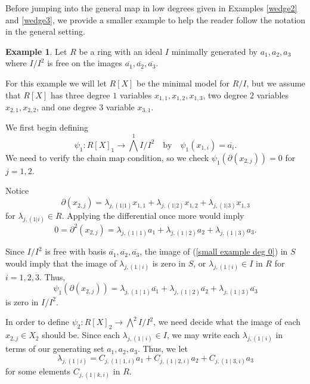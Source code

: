\documentclass{amsart}
\theoremstyle{definition}
\newtheorem{ex}[theorem]{Example}
\theoremstyle{remark}
\begin{document}
Before jumping into the general map in low degrees given in Examples \ref{wedge2} and \ref{wedge3}, we provide a smaller example to help the reader follow the notation in the general setting. 
\begin{ex}
    Let $R$ be a ring with an ideal $I$ minimally generated by $a_1,a_2,a_3$ where $I/I^2$ is free on the images $\overline{a_1}, \overline{a_2}, \overline{a_3}$. 

    For this example we will let $R[X]$ be the minimal model for $R/I$, but we assume that $R[X]$ has three degree $1$ variables $x_{1,1} , x_{1,2}, x_{1,3}$, two degree $2$ variables $x_{2,1}, x_{2,2}$, and one degree $3$ variable $x_{3,1}$.

    We first begin defining 
    $$\psi_{1}: R[X]_1 \to \bigwedge^{1} I/I^2 \quad \text{by} \quad\psi_1(x_{1,i})=\overline{a_i}.$$
    We need to verify the chain map condition, so we check $\psi_1(\partial(x_{2,j}))=0$ for $j=1,2$.

    Notice
    $$\partial(x_{2,j}) = \lambda_{j, (1|1)} x_{1,1} + \lambda_{j, (1|2)} x_{1,2} + \lambda_{j, (1|3)} x_{1,3}$$
    for $\lambda_{j, (1|i)} \in R$. Applying the differential once more would imply
    \begin{equation}
\label{small example deg 0}
    0=\partial^2(x_{2,j})= \lambda_{j, (1\mid 1)} a_{1} + \lambda_{j, (1\mid 2)} a_{2} + \lambda_{j, (1 \mid 3)} a_{3}.
\end{equation}

Since $I/I^2$ is free with basis $\overline{a_1},\overline{a_2}, \overline{a_3}$, the image of (\ref{small example deg 0}) in $S$ would imply that the image of $\lambda_{j,(1\mid i)}$ is zero in $S$, or $\lambda_{j,(1 \mid i)} \in I$ in $R$ for  $i = 1,2,3$. Thus, 
\[
\psi_1(\partial(x_{2,j}))= \lambda_{j, (1\mid 1)} \overline{a_{1}} + \lambda_{j, (1\mid 2)} \overline{a_{2}} + \lambda_{j, (1 \mid 3)} \overline{a_{3}} 
\]is zero in $I/I^2$.

In order to define $\psi_2: R[ X]_2 \to \bigwedge^2I/I^2 $, we need decide what the image of each $x_{2,j} \in X_2$ should be. Since each  $\lambda_{j,(1\mid i)} \in I$, we may write each $\lambda_{j,(1\mid i)}$ in terms of our generating set $a_1, a_2, a_3$. Thus, we let
\begin{equation}
\label{smallex deg1_decomp}
\lambda_{j,(1\mid i)}= C_{j,(1\mid 1,i)}a_{1} + C_{j,(1\mid 2,i)}a_{2}  +C_{j,(1\mid 3,i)}a_{3} 
\end{equation}
for some elements $C_{j,(1\mid k,i)}$ in $R$.


\end{ex}
\end{document}
